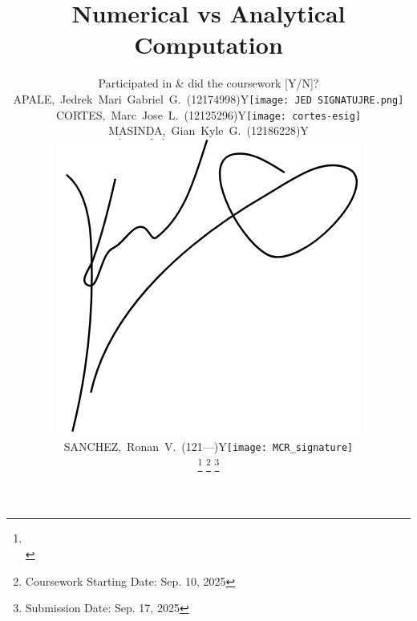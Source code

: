 




\title{Numerical vs Analytical Computation} %

\author{
	{\small
	\begin{tabular}{l l l}
    & \multicolumn{2}{c}{\tiny \textcolor[rgb]{0.9,0.9,0.9}{Participated in \& did the coursework [Y/N]?}} 
    	\\ 
		APALE,~Jedrek~Mari~Gabriel~G.~(12174998) & Y & \texttt{[image: JED SIGNATUJRE.png]}
		\\ 
		CORTES,~Marc~Jose~L.~(12125296)     & Y & \texttt{[image: cortes-esig]}
		\\ 
		MASINDA,~Gian~Kyle~G.~(12186228)  & Y & \includegraphics[height=5ex]{GIANSIG}
		\\ 
        SANCHEZ,~Ronan~V.~(121---)  & Y & \texttt{[image: MCR\_signature]} 
		\\
	\end{tabular}
	}
\thanks{\CrmD\protect\\} %
 \thanks{Coursework Starting Date: \hspace{1ex} Sep. 10, 2025}
\thanks{Submission Date: \hspace{1ex} Sep. 17, 2025}} 

%
{} %

